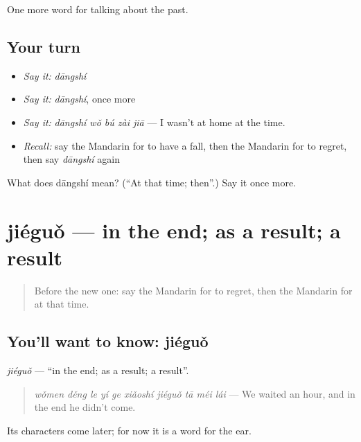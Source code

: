 \begin{grammarlens}[title={What you've built}]
One more word for talking about the past.
\end{grammarlens}

\subsection*{Your turn}
\begin{itemize}
\raggedright
  \item \emph{Say it:} \emph{dāngshí}
  \item \emph{Say it:} \emph{dāngshí}, once more
  \item \emph{Say it:} \emph{dāngshí wǒ bú zài jiā} — I wasn't at home at the time.
  \item \emph{Recall:} say the Mandarin for to have a fall, then the Mandarin for to regret, then say \emph{dāngshí} again
\end{itemize}

\begin{tcolorbox}[breakable,colback=teal!4,colframe=teal!35!black,title={Before you move on}]
What does dāngshí mean? (\textquotedblleft{}At that time; then\textquotedblright{}.) Say it once more.
\end{tcolorbox}
\section[jiéguǒ]{jiéguǒ — in the end; as a result; a result}

\label{lesson:ZH-C187-jieguo}



\begin{quote}
Before the new one: say the Mandarin for to regret, then the Mandarin for at that time.
\end{quote}

\subsection*{You'll want to know: jiéguǒ}
\emph{jiéguǒ} — \textquotedblleft{}in the end; as a result; a result\textquotedblright{}.

\begin{quote}
\emph{wǒmen děng le yí ge xiǎoshí jiéguǒ tā méi lái} — We waited an hour, and in the end he didn't come.
\end{quote}

Its characters come later; for now it is a word for the ear.

